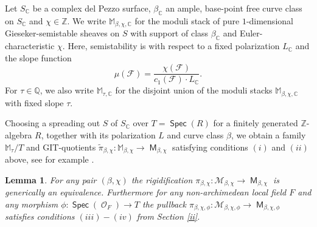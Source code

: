 \documentclass{article}
\DeclareMathOperator{\M}{{\mathsf{M}}}
\DeclareMathOperator{\Spec}{\mathsf{Spec}}
\DeclareMathOperator{\Oo}{\mathcal{O}}
\newcommand{\BC}{{\mathbb{C}}}
\newcommand{\BM}{{\mathbb{M}}}
\newcommand{\BQ}{{\mathbb{Q}}}
\newcommand{\BZ}{{\mathbb{Z}}}
\newcommand{\CF}{{\mathcal F}}
\newcommand{\CM}{{\mathcal M}}
\theoremstyle{definition}
\theoremstyle{plain}
\newtheorem{lemma}[definition]{Lemma}
\begin{document}
 Let $S_{\BC}$ be a complex del Pezzo surface, $\beta_\BC$ an ample, base-point free curve class on $S_\BC$ and $\chi \in \BZ$. We write $\BM_{\beta,\chi,\BC}$ for the moduli stack of pure $1$-dimensional Gieseker-semistable sheaves on $S$ with support of class $\beta_\BC$ and Euler-characteristic $\chi$. Here, semistability is with respect to a fixed polarization $L_\BC$ and the slope function
\[\mu(\CF) = \frac{\chi(\CF)}{c_1(\CF) \cdot L_\BC}.\]
For $\tau \in \BQ$, we also write $\BM_{\tau,\BC}$ for the disjoint union of the moduli stacks $\BM_{\beta,\chi,\BC}$ with fixed slope $\tau$. 

Choosing a spreading out $S$ of $S_\BC$ over $T=\Spec(R)$ for a finitely generated $\BZ$-algebra $R$, together with its polarization $L$ and curve class $\beta$, we obtain a family $\BM_{\tau}/T$ and GIT-quotients $\tilde{\pi}_{\beta,\chi}: \BM_{\beta,\chi} \to \M_{\beta,\chi}$ satisfying conditions $(i)$ and $(ii)$ above, see for example \cite[Section 2.1]{COW21}. 




\begin{lemma}\label{conc} For any pair $(\beta,\chi)$ the rigidification $\pi_{\beta,\chi}:\CM_{\beta,\chi} \to \M_{\beta,\chi}$ is generically an equivalence. Furthermore for any non-archimedean local field $F$ and any morphism $\phi:\Spec(\Oo_F) \to T$ the pullback $\pi_{\beta,\chi,\phi}\colon \CM_{\beta,\chi,\phi} \to \M_{\beta,\chi,\phi}$  satisfies conditions $(iii) - (iv)$ from Section \ref{ii}.
\end{lemma}
\end{document}
